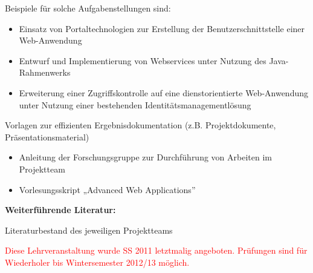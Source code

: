 \begin{course}
\begin{content}
 

Beispiele für solche Aufgabenstellungen sind:

 \begin{itemize}\item Einsatz von Portaltechnologien zur Erstellung der Benutzerschnittstelle einer Web-Anwendung  \item Entwurf und Implementierung von Webservices unter Nutzung des Java-Rahmenwerks  \item Erweiterung einer Zugriffskontrolle auf eine dienstorientierte Web-Anwendung unter Nutzung einer bestehenden Identitätsmanagementlösung  \end{itemize}
\end{content}

\begin{media}Vorlagen zur effizienten Ergebnisdokumentation (z.B. Projektdokumente, Präsentationsmaterial)

\end{media}

\begin{literature}\begin{itemize}\item Anleitung der Forschungsgruppe zur Durchführung von Arbeiten im Projektteam  \item Vorlesungsskript „Advanced Web Applications”  \end{itemize}

\textbf{Weiterführende Literatur:}

 

Literaturbestand des jeweiligen Projektteams

\end{literature}

\begin{remarks}\textcolor{red}{Diese Lehrveranstaltung wurde SS 2011 letztmalig angeboten. Prüfungen sind für Wiederholer bis Wintersemester 2012/13 möglich.}

\end{remarks}

\end{course}